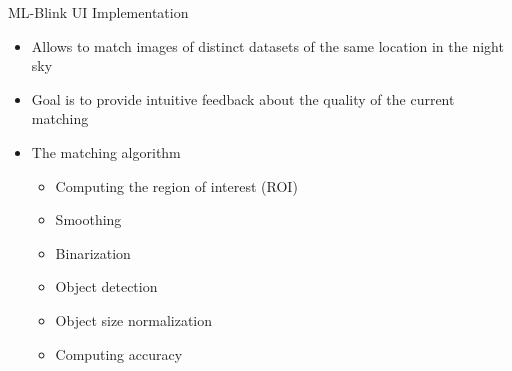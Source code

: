 \begin{frame}{ML-Blink UI Implementation}
    \begin{itemize}
        \item Allows to match images of distinct datasets of the same location in the night sky
        \item Goal is to provide intuitive feedback about the quality of the current matching 
        \item The matching algorithm
            \begin{itemize}
                \item Computing the region of interest (ROI)
                \item Smoothing
                \item Binarization
                \item Object detection
                \item Object size normalization
                \item Computing accuracy
            \end{itemize}
    \end{itemize}
\end{frame}


